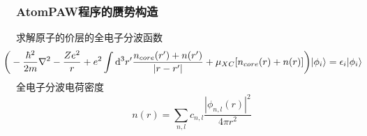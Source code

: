 \documentclass[cjk,slidestop,compress,mathserif,blue]{beamer}
\begin{document}
%

\frame
{
	\frametitle{\textrm{AtomPAW}程序的赝势构造}
	求解原子的价层的全电子分波函数
	{\fontsize{9.0pt}{5.2pt}\selectfont$$\hspace*{-17pt}\bigg(-\dfrac{\hbar^2}{2m}\nabla^2-\dfrac{Ze^2}r+e^2\int\mathrm{d}^3r^{\prime}\dfrac{n_{core}(r^{\prime})+n(r^{\prime})}{|r-r^{\prime}|}+\mu_{XC}[n_{core}(r)+n(r)]\bigg)|\phi_i\rangle=\epsilon_i|\phi_i\rangle$$}
	全电子分波电荷密度
	$$n(r)=\sum_{n,l}c_{n,l}\dfrac{|\phi_{n,l}(r)|^2}{4\pi r^2}$$
}
\end{document}

